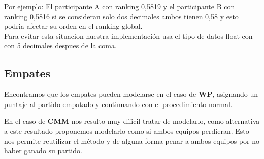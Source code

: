Por ejemplo: El participante A con ranking 0,5819 y el participante B con ranking 0,5816 si se consideran solo dos decimales ambos tienen 0,58 y esto podria afectar su orden 
en el ranking global. \\

Para evitar esta situacion nuestra implementación usa el tipo de datos float con con 5 decimales despues de la coma.\\


\subsection{Empates}

Encontramos que los empates pueden modelarse en el caso de \textbf{WP}, asignando un puntaje al partido empatado y continuando con el procedimiento normal.

En el caso de \textbf{CMM} nos resulto muy díficil tratar de modelarlo, como alternativa a este resultado proponemos modelarlo como si ambos equipos perdieran. Esto nos permite 
reutilizar el método y de alguna forma penar a ambos equipos por no haber ganado su partido.
















